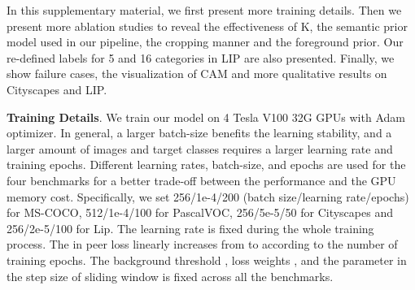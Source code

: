 \documentclass[runningheads]{llncs}
\newcommand{\PAR}[1]{\smallskip \noindent \textbf{#1}}
\begin{document}





\maketitle

In this supplementary material, we first present more training details. Then we present more ablation studies to reveal the effectiveness of K, the semantic prior model used in our pipeline, the cropping manner and the foreground prior. Our re-defined labels for 5 and 16 categories in LIP are also presented. Finally, we show failure cases, the visualization of CAM and more qualitative results on Cityscapes and LIP.

\PAR{Training Details}. We train our model on 4  Tesla V100 32G GPUs with Adam optimizer. In general, a larger batch-size benefits the learning stability, and a larger amount of images and target classes requires a larger learning rate and training epochs. Different learning rates, batch-size, and epochs are used for the four benchmarks for a better trade-off between the performance and the GPU memory cost. Specifically, we set 256/1e-4/200 (batch size/learning rate/epochs) for MS-COCO, 512/1e-4/100 for PascalVOC, 256/5e-5/50 for Cityscapes and 256/2e-5/100 for Lip. The learning rate is fixed during the whole training process. The  in peer loss linearly increases from  to  according to the number of training epochs. The background threshold , loss weights , and the parameter  in the step size of sliding window is fixed across all the benchmarks. 
\end{document}

